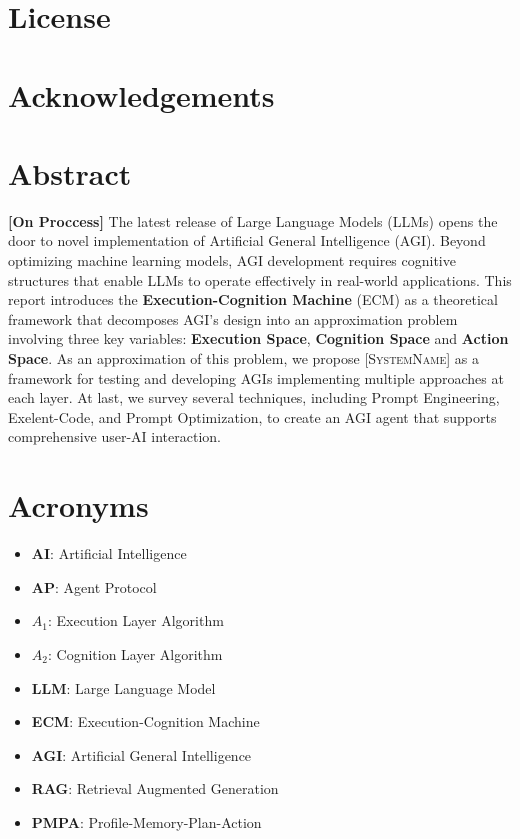 
\chapter*{License}
\vspace{4cm}
\lipsum[1]

\chapter*{Acknowledgements}
\lipsum[2]



\chapter*{Abstract}
\textbf{[On Proccess]} The latest release of Large Language Models (LLMs) opens the door to novel
implementation of Artificial General Intelligence (AGI).  Beyond optimizing
machine learning models, AGI development requires cognitive structures that
enable LLMs to operate effectively in real-world applications. This report
introduces the \textbf{Execution-Cognition Machine} (ECM) as a theoretical
framework that decomposes AGI's design into an approximation problem involving
three key variables: \textbf{Execution Space}, \textbf{Cognition Space} and 
\textbf{Action Space}. As an approximation of this problem, we propose
\textsc{[SystemName]} as a framework for testing and developing AGIs
implementing multiple approaches at each layer. At last, we survey several
techniques, including Prompt Engineering, Exelent-Code, and Prompt Optimization,
to create an AGI agent that supports comprehensive user-AI interaction.



\chapter*{Acronyms}
\begin{itemize}
    \item \textbf{AI}: Artificial Intelligence
    \item \textbf{AP}: Agent Protocol
    \item \textbf{$A_1$}: Execution Layer Algorithm
    \item \textbf{$A_2$}: Cognition Layer Algorithm
    \item \textbf{LLM}: Large Language Model
    \item \textbf{ECM}: Execution-Cognition Machine
    \item \textbf{AGI}: Artificial General Intelligence
    \item \textbf{RAG}: Retrieval Augmented Generation 
    \item \textbf{PMPA}: Profile-Memory-Plan-Action

\end{itemize}

\begingroup
\setlength{\parskip}{0pt}
\setlength{\parindent}{3pt}
\tableofcontents
\endgroup

